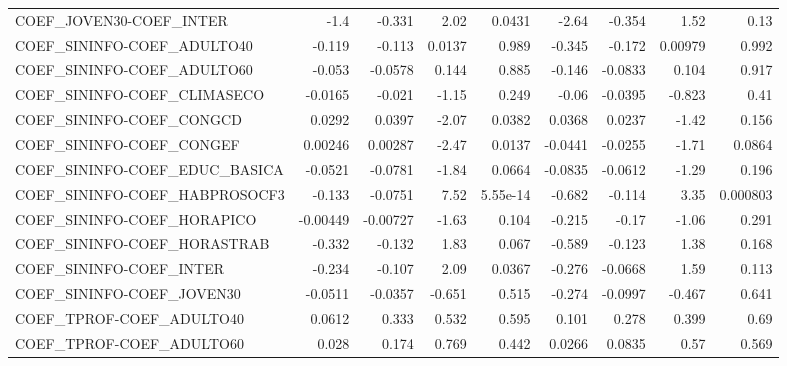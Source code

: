 \begin{tabular}{lrrrrrrrr}
COEF\_JOVEN30-COEF\_INTER             &        -1.4 &       -0.331 &    2.02 &   0.0431 &      -2.64 &      -0.354 &         1.52 &          0.13 \\
COEF\_SININFO-COEF\_ADULTO40          &      -0.119 &       -0.113 &  0.0137 &    0.989 &     -0.345 &      -0.172 &      0.00979 &         0.992 \\
COEF\_SININFO-COEF\_ADULTO60          &      -0.053 &      -0.0578 &   0.144 &    0.885 &     -0.146 &     -0.0833 &        0.104 &         0.917 \\
COEF\_SININFO-COEF\_CLIMASECO         &     -0.0165 &       -0.021 &   -1.15 &    0.249 &      -0.06 &     -0.0395 &       -0.823 &          0.41 \\
COEF\_SININFO-COEF\_CONGCD            &      0.0292 &       0.0397 &   -2.07 &   0.0382 &     0.0368 &      0.0237 &        -1.42 &         0.156 \\
COEF\_SININFO-COEF\_CONGEF            &     0.00246 &      0.00287 &   -2.47 &   0.0137 &    -0.0441 &     -0.0255 &        -1.71 &        0.0864 \\
COEF\_SININFO-COEF\_EDUC\_BASICA       &     -0.0521 &      -0.0781 &   -1.84 &   0.0664 &    -0.0835 &     -0.0612 &        -1.29 &         0.196 \\
COEF\_SININFO-COEF\_HABPROSOCF3       &      -0.133 &      -0.0751 &    7.52 & 5.55e-14 &     -0.682 &      -0.114 &         3.35 &      0.000803 \\
COEF\_SININFO-COEF\_HORAPICO          &    -0.00449 &     -0.00727 &   -1.63 &    0.104 &     -0.215 &       -0.17 &        -1.06 &         0.291 \\
COEF\_SININFO-COEF\_HORASTRAB         &      -0.332 &       -0.132 &    1.83 &    0.067 &     -0.589 &      -0.123 &         1.38 &         0.168 \\
COEF\_SININFO-COEF\_INTER             &      -0.234 &       -0.107 &    2.09 &   0.0367 &     -0.276 &     -0.0668 &         1.59 &         0.113 \\
COEF\_SININFO-COEF\_JOVEN30           &     -0.0511 &      -0.0357 &  -0.651 &    0.515 &     -0.274 &     -0.0997 &       -0.467 &         0.641 \\
COEF\_TPROF-COEF\_ADULTO40            &      0.0612 &        0.333 &   0.532 &    0.595 &      0.101 &       0.278 &        0.399 &          0.69 \\
COEF\_TPROF-COEF\_ADULTO60            &       0.028 &        0.174 &   0.769 &    0.442 &     0.0266 &      0.0835 &         0.57 &         0.569 \\

\end{tabular}
